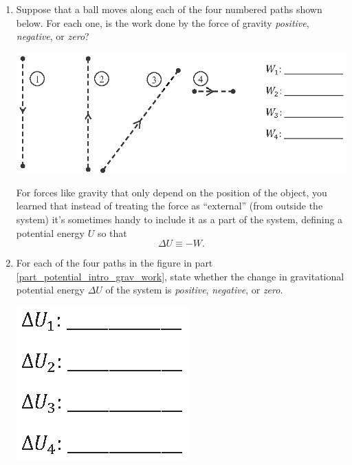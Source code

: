 \begin{enumerate}[wide, label=(\emph{\alph*})]

\item Suppose that a ball moves along each of the four numbered paths shown below.  For each one, is the work done by the force of gravity \textit{positive}, \textit{negative}, or \textit{zero}? \label{part_potential_intro_grav_work} 
\begin{center}
\vspace{0.1in}
\includegraphics{potential_intro/activity_1_figs/gravity_paths.eps}
\vspace{0.1in}
\end{center}

For forces like gravity that only depend on the position of the object, you learned that instead of treating the force as  ``external'' (from outside the system) it's sometimes handy to include it as a part of the system, defining a potential energy $U$ so that
$$\Delta U \equiv -W.$$

\item For each of the four paths in the figure in part \ref{part_potential_intro_grav_work}, state whether the change in gravitational potential energy $\Delta U$ of the system is \textit{positive}, \textit{negative}, or \textit{zero}.
\begin{center}
\vspace{0.1in}
\includegraphics{potential_intro/activity_1_figs/gravity_potentials.eps}
\vspace{0.1in}
\end{center}


\end{enumerate}
